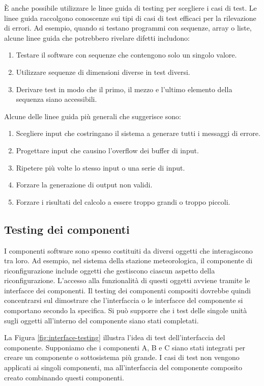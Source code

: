 È anche possibile utilizzare le linee guida di testing per scegliere i casi di test. Le linee guida raccolgono conoscenze sui tipi di casi di test efficaci per la rilevazione di errori. Ad esempio, quando si testano programmi con sequenze, array o liste, alcune linee guida che potrebbero rivelare difetti includono:
\begin{enumerate}
    \item Testare il software con sequenze che contengono solo un singolo valore.
    \item Utilizzare sequenze di dimensioni diverse in test diversi.
    \item Derivare test in modo che il primo, il mezzo e l’ultimo elemento della sequenza siano accessibili.
\end{enumerate}
Alcune delle linee guida più generali che suggerisce sono:
\begin{enumerate}
    \item Scegliere input che costringano il sistema a generare tutti i messaggi di errore.
    \item Progettare input che causino l’overflow dei buffer di input.
    \item Ripetere più volte lo stesso input o una serie di input.
    \item Forzare la generazione di output non validi.
    \item Forzare i risultati del calcolo a essere troppo grandi o troppo piccoli.
\end{enumerate}

\subsection{Testing dei componenti}
I componenti software sono spesso costituiti da diversi oggetti che interagiscono tra loro. Ad esempio, nel sistema della stazione meteorologica, il componente di riconfigurazione include oggetti che gestiscono ciascun aspetto della riconfigurazione. L’accesso alla funzionalità di questi oggetti avviene tramite le interfacce dei componenti. Il testing dei componenti compositi dovrebbe quindi concentrarsi sul dimostrare che l'interfaccia o le interfacce del componente si comportano secondo la specifica. Si può supporre che i test delle singole unità sugli oggetti all'interno del componente siano stati completati.

La Figura \ref{fig:interface-testing} illustra l'idea di test dell'interfaccia del componente. Supponiamo che i componenti A, B e C siano stati integrati per creare un componente o sottosistema più grande. I casi di test non vengono applicati ai singoli componenti, ma all’interfaccia del componente composito creato combinando questi componenti.


